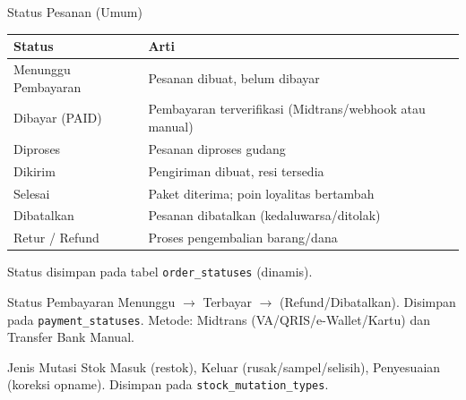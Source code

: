 
\begin{flowsection}{Status Pesanan (Umum)}
\begin{center}
\renewcommand{\arraystretch}{1.3}
\begin{tabular}{|l|p{9.5cm}|}
\hline
\textbf{Status} & \textbf{Arti} \\ \hline
Menunggu Pembayaran & Pesanan dibuat, belum dibayar \\ \hline
Dibayar (PAID) & Pembayaran terverifikasi (Midtrans/webhook atau manual) \\ \hline
Diproses & Pesanan diproses gudang \\ \hline
Dikirim & Pengiriman dibuat, resi tersedia \\ \hline
Selesai & Paket diterima; poin loyalitas bertambah \\ \hline
Dibatalkan & Pesanan dibatalkan (kedaluwarsa/ditolak) \\ \hline
Retur / Refund & Proses pengembalian barang/dana \\ \hline
\end{tabular}
\end{center}
Status disimpan pada tabel \texttt{order\_statuses} (dinamis).
\end{flowsection}

\begin{flowsection}{Status Pembayaran}
Menunggu $\rightarrow$ Terbayar $\rightarrow$ (Refund/Dibatalkan). Disimpan pada
\texttt{payment\_statuses}. Metode: Midtrans (VA/QRIS/e-Wallet/Kartu) dan
Transfer Bank Manual.
\end{flowsection}

\begin{flowsection}{Jenis Mutasi Stok}
Masuk (restok), Keluar (rusak/sampel/selisih), Penyesuaian (koreksi opname).
Disimpan pada \texttt{stock\_mutation\_types}.
\end{flowsection}


